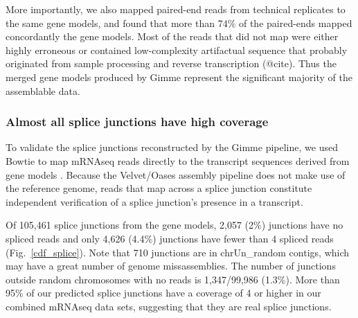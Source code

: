\documentclass[10pt]{article}
\begin{document}
More importantly, we also mapped paired-end reads from technical replicates to
the same gene models, and found that more than 74\% of the paired-ends mapped
concordantly the gene models.  Most of the reads that did not map were either
highly erroneous or contained low-complexity artifactual sequence that probably
originated from sample processing and reverse transcription (@cite).  Thus the
merged gene models produced by Gimme represent the significant majority of the
assemblable data.



\subsubsection*{Almost all splice junctions have high coverage}

To validate the splice junctions reconstructed by the Gimme pipeline,
we used Bowtie to map mRNAseq reads directly to the transcript sequences
derived from gene models \cite{Langmead:2009fv}.  Because the
Velvet/Oases assembly pipeline does not make use of the reference
genome, reads that map across a splice junction constitute independent
verification of a splice junction's presence in a transcript.

Of 105,461 splice junctions from the gene models, 2,057 (2\%) junctions have no
spliced reads and only 4,626 (4.4\%) junctions have fewer than 4 spliced reads
(Fig.~\ref{cdf_splice}).  Note that 710 junctions are in chrUn\_random contigs,
which may have a great number of genome missassemblies. The number of junctions
outside random chromosomes with no reads is 1,347/99,986 (1.3\%).
More than 95\% of our predicted splice junctions have a coverage
of 4 or higher in our combined mRNAseq data sets, suggesting that they are
real splice junctions.
\end{document}
